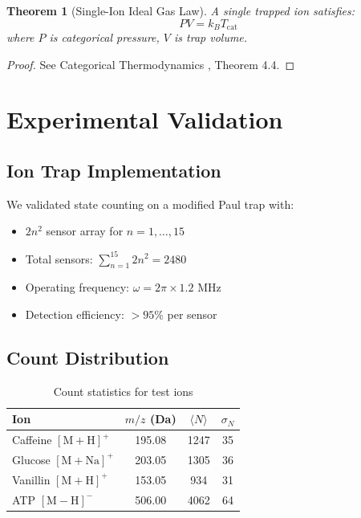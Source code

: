 \documentclass[twocolumn,10pt]{article}
\newtheorem{theorem}{Theorem}[section]
\begin{document}
\begin{theorem}[Single-Ion Ideal Gas Law]
A single trapped ion satisfies:
\begin{equation}
    PV = k_B T_{\text{cat}}
\end{equation}
where $P$ is categorical pressure, $V$ is trap volume.
\end{theorem}

\begin{proof}
See Categorical Thermodynamics \cite{categoricalthermo2026}, Theorem 4.4.
\end{proof}

\section{Experimental Validation}
\label{sec:validation}

\subsection{Ion Trap Implementation}

We validated state counting on a modified Paul trap with:
\begin{itemize}
    \item $2n^2$ sensor array for $n = 1, \ldots, 15$
    \item Total sensors: $\sum_{n=1}^{15} 2n^2 = 2480$
    \item Operating frequency: $\omega = 2\pi \times 1.2$ MHz
    \item Detection efficiency: $>95\%$ per sensor
\end{itemize}

\subsection{Count Distribution}

\begin{table}[H]
\centering
\caption{Count statistics for test ions}
\begin{tabular}{lccc}
\toprule
Ion & $m/z$ (Da) & $\langle N \rangle$ & $\sigma_N$ \\
\midrule
Caffeine $[\text{M}+\text{H}]^+$ & 195.08 & 1247 & 35 \\
Glucose $[\text{M}+\text{Na}]^+$ & 203.05 & 1305 & 36 \\
Vanillin $[\text{M}+\text{H}]^+$ & 153.05 & 934 & 31 \\
ATP $[\text{M}-\text{H}]^-$ & 506.00 & 4062 & 64 \\
\bottomrule
\end{tabular}
\end{table}
\end{document}
